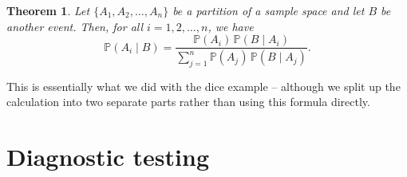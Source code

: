 \documentclass[
  a4paper,
]{book}
\newtheorem{theorem}{Theorem}[chapter]
\theoremstyle{definition}
\theoremstyle{definition}
\theoremstyle{definition}
\theoremstyle{definition}
\theoremstyle{remark}
\begin{document}
\begin{theorem}
\protect\hypertarget{thm:bayes-total}{}\label{thm:bayes-total}Let \(\{A_1, A_2, \dots, A_n\}\) be a partition of a sample space and let \(B\) be another event. Then, for all \(i=1,2,\dots,n\), we have
\[ \mathbb P(A_i \mid B) = \frac{\mathbb P(A_i) \,\mathbb P(B \mid A_i)}{\sum_{j=1}^n \mathbb P(A_j) \, \mathbb P(B \mid A_j)} .  \]
\end{theorem}

This is essentially what we did with the dice example -- although we split up the calculation into two separate parts rather than using this formula directly.

\hypertarget{screening}{%
\section{Diagnostic testing}\label{screening}}
\end{document}
